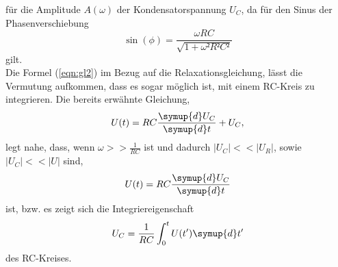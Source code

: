 für die Amplitude $A(\omega)$ der Kondensatorspannung $U_C$, da für den Sinus der Phasenverschiebung
\begin{equation}
  \sin(\phi) = \frac{\omega RC}{\sqrt{1 + \omega² R²C²}} \label{fuck2}
\end{equation}
gilt.\\
Die Formel (\ref{eqn:gl2}) im Bezug auf die Relaxationsgleichung, lässt die Vermutung aufkommen, dass es sogar möglich ist, mit einem RC-Kreis zu integrieren.
Die bereits erwähnte Gleichung,
\begin{equation}
  U(t) = RC\frac{\symup{d} U_C}{\symup{d} t} + U_C,
\end{equation}
legt nahe, dass, wenn $\omega>>\frac{1}{RC}$ ist und dadurch $|U_C| << |U_R|$, sowie $|U_C| << |U|$ sind,
\begin{equation}
  U(t) = RC\frac{\symup{d} U_C}{\symup{d} t}
\end{equation}
ist, bzw. es zeigt sich die Integriereigenschaft
\begin{equation}
  U_C = \frac{1}{RC}\int_0^t U(t')\symup{d}t'
\end{equation}
des RC-Kreises.
